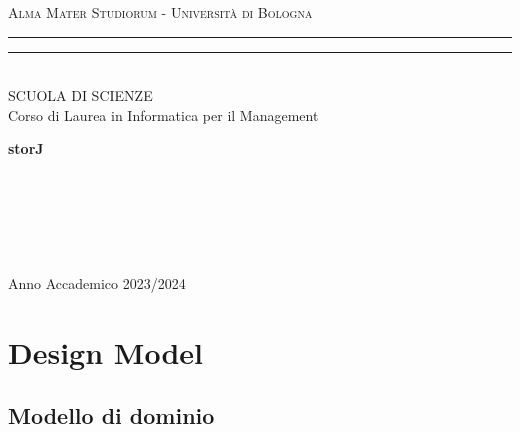 \documentclass{article}
\begin{document}
\pagestyle{empty}

\begin{titlepage} 
\begin{center}
    {{\Large{\textsc{Alma Mater Studiorum - Università di Bologna}}}}
    \rule[0.1cm]{\textwidth}{0.1px}
    \rule[0.5cm]{\textwidth}{0.6px}\\
    {\large{SCUOLA DI SCIENZE \\ Corso di Laurea in Informatica per il Management}}
\end{center}

\vspace{50px}

\begin{center}
    {\LARGE{{\bf storJ}}}\
\end{center}

\vspace{115px}
\par
\noindent
\begin{minipage}[t]{0.04\textwidth}
~
\end{minipage}
\begin{minipage}[t]{0.4\textwidth}
\end{minipage}
\hfill
\begin{minipage}[t]{0.4\textwidth}\raggedleft
    {\
}
\end{minipage}
\begin{minipage}[t]{0.04\textwidth}
~
\end{minipage}

\vspace*{210px}

\begin{center}
    \large{Anno Accademico 2023/2024}
\end{center}
\end{titlepage}

\section{Design Model}

\subsection{Modello di dominio} 
\large
\end{document}
